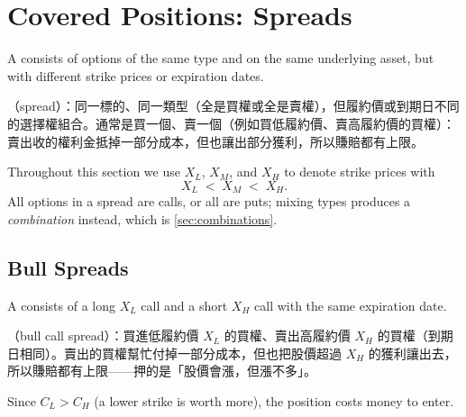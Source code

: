 \section{Covered Positions: Spreads}
\label{sec:option-spreads}


\begin{definition}
	A  consists of options of the same type and on the same underlying asset, but with different strike prices or expiration dates.
\end{definition}

\suppstart
\begin{remark}
	（spread）：同一標的、同一類型（全是買權或全是賣權），但履約價或到期日不同的選擇權組合。通常是買一個、賣一個（例如買低履約價、賣高履約價的買權）：賣出收的權利金抵掉一部分成本，但也讓出部分獲利，所以賺賠都有上限。
\end{remark}
\suppend

Throughout this section we use $X_{L}$, $X_{M}$, and $X_{H}$ to denote strike prices with
\[
	X_{L} \;<\; X_{M} \;<\; X_{H} .
\]
\suppstart
All options in a spread are calls, or all are puts; mixing types produces a \emph{combination} instead, which is \autoref{sec:combinations}.
\suppend

\subsection{Bull Spreads}
\label{sec:bull-spreads}


\begin{definition}
	A  consists of a long $X_{L}$ call and a short $X_{H}$ call with the same expiration date.
\end{definition}

\suppstart
\begin{remark}
	（bull call spread）：買進低履約價 $X_{L}$ 的買權、賣出高履約價 $X_{H}$ 的買權（到期日相同）。賣出的買權幫忙付掉一部分成本，但也把股價超過 $X_{H}$ 的獲利讓出去，所以賺賠都有上限——押的是「股價會漲，但漲不多」。
\end{remark}

Since $C_{L}>C_{H}$ (a lower strike is worth more), the position costs money to enter.
\suppend

